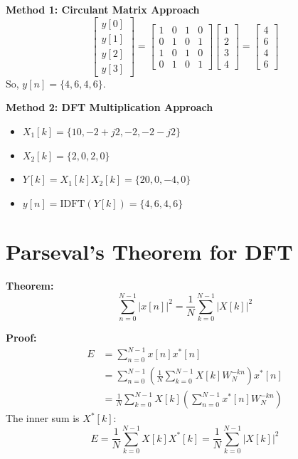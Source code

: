 \documentclass[11pt,a4paper]{article}
\begin{document}
\textbf{Method 1: Circulant Matrix Approach}
\begin{equation}
\begin{bmatrix} y[0] \\ y[1] \\ y[2] \\ y[3] \end{bmatrix} = \begin{bmatrix} 1 & 0 & 1 & 0 \\ 0 & 1 & 0 & 1 \\ 1 & 0 & 1 & 0 \\ 0 & 1 & 0 & 1 \end{bmatrix} \begin{bmatrix} 1 \\ 2 \\ 3 \\ 4 \end{bmatrix} = \begin{bmatrix} 4 \\ 6 \\ 4 \\ 6 \end{bmatrix}
\end{equation}
So, $y[n] = \{4, 6, 4, 6\}$.

\textbf{Method 2: DFT Multiplication Approach}
\begin{itemize}
    \item $X_1[k] = \{10, -2+j2, -2, -2-j2\}$
    \item $X_2[k] = \{2, 0, 2, 0\}$
    \item $Y[k] = X_1[k]X_2[k] = \{20, 0, -4, 0\}$
    \item $y[n] = \text{IDFT}(Y[k]) = \{4, 6, 4, 6\}$
\end{itemize}

\section{Parseval's Theorem for DFT}

\textbf{Theorem:}
\begin{equation}
\sum_{n=0}^{N-1} |x[n]|^2 = \frac{1}{N} \sum_{k=0}^{N-1} |X[k]|^2
\end{equation}

\textbf{Proof:}
\begin{align}
E &= \sum_{n=0}^{N-1} x[n] x^*[n] \\
&= \sum_{n=0}^{N-1} \left( \frac{1}{N} \sum_{k=0}^{N-1} X[k] W_N^{-kn} \right) x^*[n] \\
&= \frac{1}{N} \sum_{k=0}^{N-1} X[k] \left( \sum_{n=0}^{N-1} x^*[n] W_N^{-kn} \right)
\end{align}
The inner sum is $X^*[k]$:
\begin{equation}
E = \frac{1}{N} \sum_{k=0}^{N-1} X[k] X^*[k] = \frac{1}{N} \sum_{k=0}^{N-1} |X[k]|^2
\end{equation}
\end{document}
